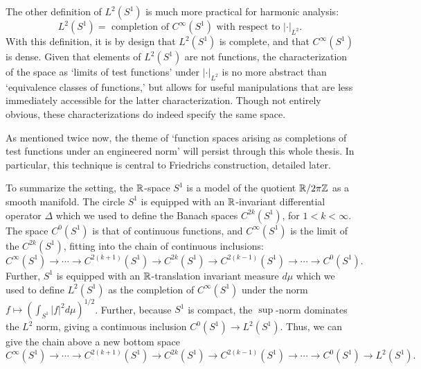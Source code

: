 \documentclass[12pt]{amsart}
\begin{document}
The other definition of $L^2(S^1)$ is much more practical for harmonic analysis:
	\begin{equation*}
		L^2(S^1)=\text{ completion of $C^\infty(S^1)$ with respect to $|\cdot|_{L^2}$}.
	\end{equation*}
With this definition, it is by design that $L^2(S^1)$ is complete, and that $C^\infty(S^1)$ is dense. Given that elements of $L^2(S^1)$ are not functions, the characterization of the space as `limits of test functions' under $|\cdot|_{L^2}$ is no more abstract than `equivalence classes of functions,' but allows for useful manipulations that are less immediately accessible for the latter characterization. Though not entirely obvious, these characterizations do indeed specify the same space.

As mentioned twice now, the theme of `function spaces arising as completions of test functions under an engineered norm' will persist through this whole thesis. In particular, this technique is central to Friedrichs construction, detailed later.

To summarize the setting, the $\mathbb{R}$-space $S^1$ is a model of the quotient $\mathbb{R} / 2\pi \mathbb{Z}$ as a smooth manifold. The circle $S^1$ is equipped with an $\mathbb{R}$-invariant differential operator $\Delta$ which we used to define the Banach spaces $C^{2k}(S^1)$, for $1<k<\infty$. The space $C^0(S^1)$ is that of continuous functions, and $C^\infty(S^1)$ is the limit of the $C^{2k}(S^1)$, fitting into the chain of continuous inclusions:
	\begin{equation*}
		C^{\infty}(S^1) \to \cdots \to C^{2(k+1)}(S^1) \to C^{2k}(S^1) \to C^{2(k-1)}(S^1) \to \cdots \to C^0(S^1).
	\end{equation*}
Further, $S^1$ is equipped with an $\mathbb{R}$-translation invariant measure $d\mu$ which we used to define $L^2(S^1)$ as the completion of $C^\infty(S^1)$ under the norm $f\mapsto \left(\int_{S^1} |f|^2 d\mu\right)^{1/2}$.  Further, because $S^1$ is compact, the $\sup$-norm dominates the $L^2$ norm, giving a continuous inclusion $C^0(S^1) \to L^2(S^1)$. Thus, we can give the chain above a new bottom space 
 	\begin{equation*}
		C^{\infty}(S^1) \to \cdots \to C^{2(k+1)}(S^1) \to C^{2k}(S^1) \to C^{2(k-1)}(S^1) \to \cdots \to C^0(S^1)\to L^2(S^1).
	\end{equation*}
\end{document}

